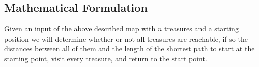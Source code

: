 \documentclass[12pt]{article}
\begin{document}

\newpage

\subsection{Mathematical Formulation}
Given an input of the above described map with $n$ treasures and a starting position we will
determine whether or not all treasures are reachable, if so the distances between all of them
and the length of the shortest path to start at the starting point, visit every treasure, and
return to the start point.

\end{document}
